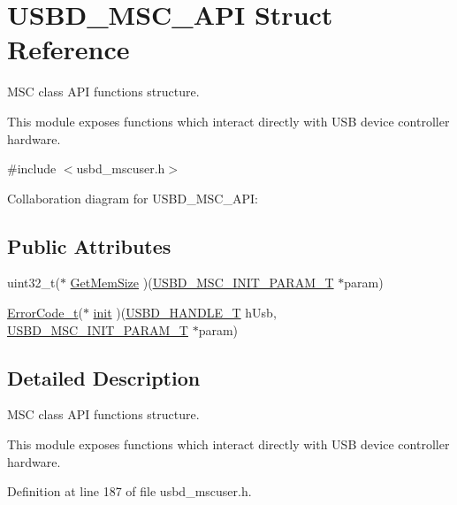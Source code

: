 \hypertarget{structUSBD__MSC__API}{}\section{U\+S\+B\+D\+\_\+\+M\+S\+C\+\_\+\+A\+PI Struct Reference}
\label{structUSBD__MSC__API}


M\+SC class A\+PI functions structure.

This module exposes functions which interact directly with U\+SB device controller hardware.  




{\ttfamily \#include $<$usbd\+\_\+mscuser.\+h$>$}



Collaboration diagram for U\+S\+B\+D\+\_\+\+M\+S\+C\+\_\+\+A\+PI\+:
\subsection*{Public Attributes}
\begin{DoxyCompactItemize}
\item 
uint32\+\_\+t($\ast$ \hyperlink{structUSBD__MSC__API_a73a9d240b20fcd83e6d2c9675420d626}{Get\+Mem\+Size} )(\hyperlink{group__USBD__MSC_ga01cbe726c0ee97ee44661ca88d7e8fbd}{U\+S\+B\+D\+\_\+\+M\+S\+C\+\_\+\+I\+N\+I\+T\+\_\+\+P\+A\+R\+A\+M\+\_\+T} $\ast$param)
\item 
\hyperlink{error_8h_a905255056c349318139d94aa4523d516}{Error\+Code\+\_\+t}($\ast$ \hyperlink{structUSBD__MSC__API_a2654b01293392f8a58412e88b46f1e91}{init} )(\hyperlink{group__USBD__Core_gafdbb2204d929cb9d75736bd2b42342ac}{U\+S\+B\+D\+\_\+\+H\+A\+N\+D\+L\+E\+\_\+T} h\+Usb, \hyperlink{group__USBD__MSC_ga01cbe726c0ee97ee44661ca88d7e8fbd}{U\+S\+B\+D\+\_\+\+M\+S\+C\+\_\+\+I\+N\+I\+T\+\_\+\+P\+A\+R\+A\+M\+\_\+T} $\ast$param)
\end{DoxyCompactItemize}


\subsection{Detailed Description}
M\+SC class A\+PI functions structure.

This module exposes functions which interact directly with U\+SB device controller hardware. 



Definition at line 187 of file usbd\+\_\+mscuser.\+h.



